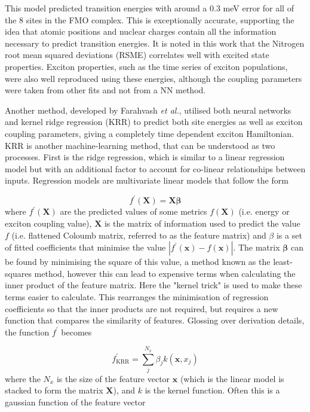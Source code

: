 This model predicted \Qy transition energies with around a 0.3 meV error for all
of the 8 sites in the FMO complex. This is exceptionally accurate, supporting the
idea that atomic positions and nuclear charges contain all the information necessary
to predict transition energies. It is noted in this work that the Nitrogen root
mean squared deviations (RSME) correlates well with excited state properties. Exciton
properties, such as the time series of exciton populations, were also well reproduced
using these \Qy energies, although the coupling parameters were taken from other
fits and not from a NN method.

Another method, developed by Farahvash \emph{et al.}, utilised both neural networks
and kernel ridge regression (KRR) to predict both site energies as well as exciton 
coupling parameters, giving a completely time dependent exciton Hamiltonian. KRR
is another machine-learning method, that can be understood as two processes. First
is the ridge regression, which is similar to a linear regression model but with
an additional factor to account for co-linear relationships between inputs. Regression
models are multivariate linear models that follow the form

\begin{equation}
	f^\prime\left(\mathbf{X}\right) = \mathbf{X} \mathbf{\beta}
\end{equation}
%
where $f^\prime\left(\mathbf{X}\right)$ are the predicted values of some metrics $f\left(\mathbf{X}\right)$ 
(i.e. \Qy energy or exciton coupling value), $\mathbf{X}$ is the matrix of information
used to predict the value $f$ (i.e. flattened Coloumb matrix, referred to as the feature
matrix) and $\beta$ is a set of fitted coefficients that minimise the value $\left\lvert f^\prime \left( \mathbf{x}\right) - f \left(\mathbf{x}\right)\right\rvert$.
The matrix $\mathbf{\beta}$ can be found by minimising the square of this value, 
a method known as the least-squares method, however this can lead to expensive terms 
when calculating the inner product of the feature matrix. Here the "kernel trick" 
is used to make these terms easier to calculate. This rearranges the minimisation 
of regression coefficients so that the inner products are not required, but requires 
a new function that compares the similarity of features. Glossing over derivation
details, the function $f^\prime$ becomes

\begin{equation}
	f_{\text{KRR}}^\prime = \sum^{N_x}_j \beta_j k\left(\mathbf{x}, x_j\right)
\end{equation}
%
where the $N_x$ is the size of the feature vector $\mathbf{x}$ (which is the linear
model is stacked to form the matrix $\mathbf{X}$), and $k$ is the kernel function.
Often this is a gaussian function of the feature vector

